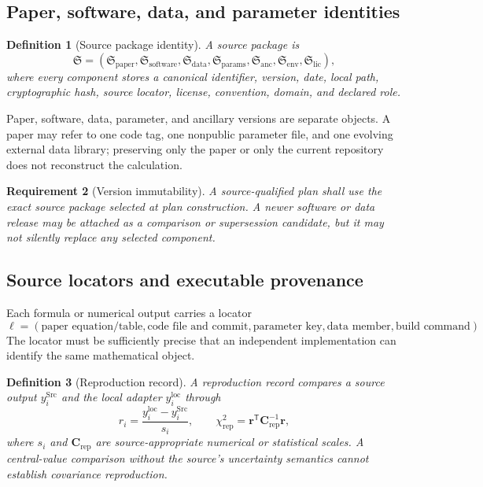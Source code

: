 \documentclass[11pt]{article}
\newtheorem{definition}{Definition}[section]
\newtheorem{requirement}[definition]{Requirement}
\newcommand{\Src}{\ensuremath{\mathrm{Src}}}
\begin{document}
\subsection{Paper, software, data, and parameter identities}

\begin{definition}[Source package identity]
A source package is
\begin{equation}
 \mathfrak S
 =
 \left(
 \mathfrak S_{\mathrm{paper}},
 \mathfrak S_{\mathrm{software}},
 \mathfrak S_{\mathrm{data}},
 \mathfrak S_{\mathrm{params}},
 \mathfrak S_{\mathrm{anc}},
 \mathfrak S_{\mathrm{env}},
 \mathfrak S_{\mathrm{lic}}
 \right),
 \label{eq:source-package}
\end{equation}
where every component stores a canonical identifier, version, date, local path, cryptographic hash, source locator, license, convention, domain, and declared role.
\end{definition}

Paper, software, data, parameter, and ancillary versions are separate objects.  A paper may refer to one code tag, one nonpublic parameter file, and one evolving external data library; preserving only the paper or only the current repository does not reconstruct the calculation.

\begin{requirement}[Version immutability]
A source-qualified plan shall use the exact source package selected at plan construction.  A newer software or data release may be attached as a comparison or supersession candidate, but it may not silently replace any selected component.
\end{requirement}

\subsection{Source locators and executable provenance}

Each formula or numerical output carries a locator
\begin{equation}
 \ell
 =
 \left(
 \text{paper equation/table},
 \text{code file and commit},
 \text{parameter key},
 \text{data member},
 \text{build command}
 \right).
 \label{eq:source-locator}
\end{equation}
The locator must be sufficiently precise that an independent implementation can identify the same mathematical object.

\begin{definition}[Reproduction record]
A reproduction record compares a source output \(y_i^{\Src}\) and the local adapter \(y_i^{\mathrm{loc}}\) through
\begin{equation}
 r_i
 =
 \frac{y_i^{\mathrm{loc}}-y_i^{\Src}}
 {s_i},
 \qquad
 \chi^2_{\mathrm{rep}}
 =
 \bm r^{\mathsf T}\bm C_{\mathrm{rep}}^{-1}\bm r,
 \label{eq:reproduction-residual}
\end{equation}
where \(s_i\) and \(\bm C_{\mathrm{rep}}\) are source-appropriate numerical or statistical scales.  A central-value comparison without the source's uncertainty semantics cannot establish covariance reproduction.
\end{definition}
\end{document}
